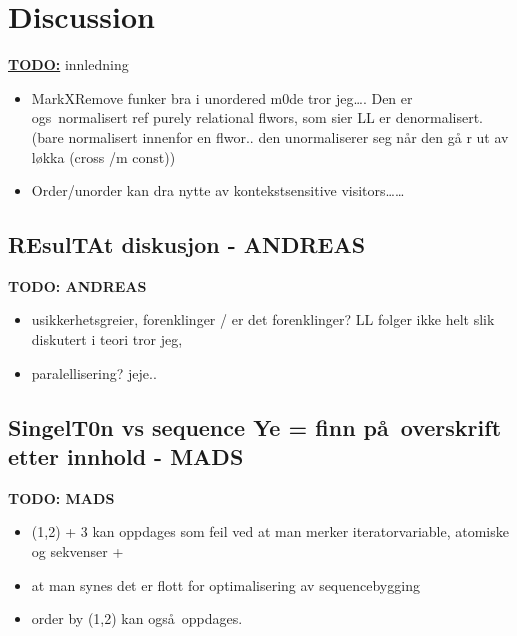 \chapter{Discussion}
\label{chapter:discussion}

\textbf{\underline{\LARGE TODO:}} innledning

\begin{itemize}
	\item MarkXRemove funker bra i unordered m0de tror jeg\ldots. Den er ogs\a~normalisert ref purely relational
	flwors, som sier LL er denormalisert. (bare normalisert innenfor en flwor.. den unormaliserer seg n\aa r den g\aa
	r ut av l\o kka (cross /m const))
	\item Order/unorder kan dra nytte av kontekstsensitive visitors\ldots\ldots
\end{itemize}

\section{REsulTAt diskusjon - {{ANDREAS}}}
\label{sect:disc:res}
\textbf{\LARGE TODO: {{ANDREAS}}}
\begin{itemize}
  \item usikkerhetsgreier, forenklinger / er det forenklinger? LL folger ikke helt slik diskutert i teori tror jeg,
  \item paralellisering? jeje..
\end{itemize}

\section{SingelT0n vs sequence Ye = finn p\aa~overskrift etter innhold - {MADS}}
\label{sect:disc:singelton}
\textbf{\LARGE TODO: {MADS}}
\begin{itemize}
   \item (1,2) + 3 kan oppdages som feil ved at man merker iteratorvariable, atomiske og sekvenser + 
   \item at man synes det er flott for optimalisering av sequencebygging 
   \item order by (1,2) kan ogs\aa~oppdages. 
\end{itemize}

